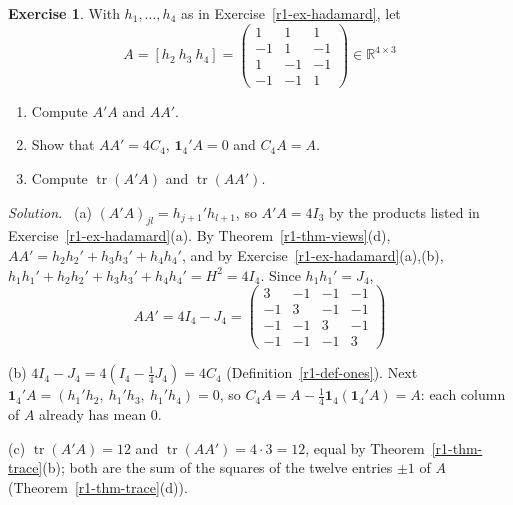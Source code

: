 \documentclass[12pt]{article}
\newcommand{\R}{\mathbb R}
\newcommand{\one}{\mathbf 1}
\DeclareMathOperator{\tr}{tr}
\theoremstyle{definition}
\newtheorem{exercise}{Exercise}
\newenvironment{solution}{\par\noindent\textit{Solution.}\ }{\par\smallskip}
\begin{document}
\begin{exercise}\label{r1-ex-gram}
With \(h_1,\dots,h_4\) as in Exercise~\ref{r1-ex-hadamard}, let
\[
A=[h_2\ h_3\ h_4]=\begin{pmatrix}1&1&1\\-1&1&-1\\1&-1&-1\\-1&-1&1\end{pmatrix}\in\R^{4\times3}
\]
\begin{enumerate}
\item Compute \(A'A\) and \(AA'\).
\item Show that \(AA'=4C_4\), \(\one_4'A=0\) and \(C_4A=A\).
\item Compute \(\tr(A'A)\) and \(\tr(AA')\).
\end{enumerate}
\end{exercise}
\begin{solution}
(a) \((A'A)_{jl}=h_{j+1}'h_{l+1}\), so \(A'A=4I_3\) by the products listed in
Exercise~\ref{r1-ex-hadamard}(a). By Theorem~\ref{r1-thm-views}(d),
\(AA'=h_2h_2'+h_3h_3'+h_4h_4'\), and by Exercise~\ref{r1-ex-hadamard}(a),(b),
\(h_1h_1'+h_2h_2'+h_3h_3'+h_4h_4'=H^2=4I_4\). Since \(h_1h_1'=J_4\),
\[
AA'=4I_4-J_4=\begin{pmatrix}3&-1&-1&-1\\-1&3&-1&-1\\-1&-1&3&-1\\-1&-1&-1&3\end{pmatrix}
\]

(b) \(4I_4-J_4=4(I_4-\frac14J_4)=4C_4\) (Definition~\ref{r1-def-ones}). Next
\(\one_4'A=(h_1'h_2,\ h_1'h_3,\ h_1'h_4)=0\), so
\(C_4A=A-\frac14\one_4(\one_4'A)=A\): each column of \(A\) already has mean \(0\).

(c) \(\tr(A'A)=12\) and \(\tr(AA')=4\cdot3=12\), equal by Theorem~\ref{r1-thm-trace}(b); both
are the sum of the squares of the twelve entries \(\pm1\) of \(A\)
(Theorem~\ref{r1-thm-trace}(d)).
\end{solution}
\end{document}
